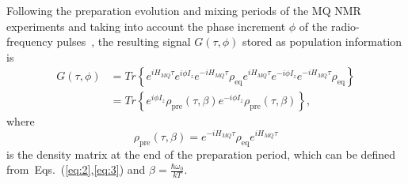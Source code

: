 \documentclass[preprint,12pt]{elsarticle}
\begin{document}
Following the preparation evolution and mixing periods of the MQ NMR experiments and taking into account the phase increment $\phi$ of the radio-frequency pulses~\cite{10}, the resulting signal $G(\tau,\phi)$ stored as population information is
%
\begin{equation} \label{eq:4}
	\begin{split}
		G(\tau,\phi)
		& = Tr \left\{
			e^{iH_{MQ}\tau} e^{i\phi I_z} e^{-iH_{MQ}\tau} \rho_\mathrm{eq}
			e^{iH_{MQ}\tau} e^{-i\phi I_z} e^{-iH_{MQ}\tau}\rho_\mathrm{eq}
		\right\}
		\\
		& = Tr \left\{
			e^{i\phi I_z} \rho_\mathrm{pre}(\tau,\beta)
      e^{-i\phi I_z}\rho_\mathrm{pre}(\tau,\beta)
		\right\},
	\end{split}
\end{equation}
%
where
%
\begin{equation} \label{eq:5}
	\rho_\mathrm{pre}(\tau,\beta) = e^{-iH_{MQ}\tau}\rho_\mathrm{eq}e^{iH_{MQ}\tau}
\end{equation}
%
is the density matrix at the end of the preparation period,
which can be defined from~Eqs.~(\ref{eq:2},\ref{eq:3}) and $\beta = \frac{\hbar \omega_0}{kT}$.
\end{document}
